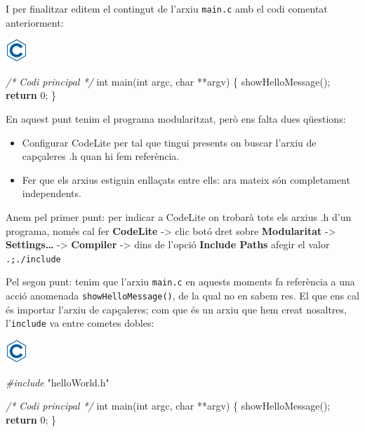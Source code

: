 \documentclass[]{book}
\newenvironment{Shaded}{\begin{snugshade}}{\end{snugshade}}
\newcommand{\DataTypeTok}[1]{\textcolor[rgb]{0.13,0.29,0.53}{#1}}
\newcommand{\DecValTok}[1]{\textcolor[rgb]{0.00,0.00,0.81}{#1}}
\newcommand{\ImportTok}[1]{#1}
\newcommand{\CommentTok}[1]{\textcolor[rgb]{0.56,0.35,0.01}{\textit{#1}}}
\newcommand{\ControlFlowTok}[1]{\textcolor[rgb]{0.13,0.29,0.53}{\textbf{#1}}}
\newcommand{\PreprocessorTok}[1]{\textcolor[rgb]{0.56,0.35,0.01}{\textit{#1}}}
\newcommand{\NormalTok}[1]{#1}
\providecommand{\tightlist}{%
  \setlength{\itemsep}{0pt}\setlength{\parskip}{0pt}}
\begin{document}
I per finalitzar editem el contingut de l'arxiu \texttt{main.c} amb el
codi comentat anteriorment:

\includegraphics{./img/c.png}

\begin{Shaded}
\begin{Highlighting}[]
\CommentTok{/* Codi principal */}
\DataTypeTok{int}\NormalTok{ main(}\DataTypeTok{int}\NormalTok{ argc, }\DataTypeTok{char}\NormalTok{ **argv) \{}
\NormalTok{    showHelloMessage();}
    \ControlFlowTok{return} \DecValTok{0}\NormalTok{;}
\NormalTok{\}}
\end{Highlighting}
\end{Shaded}

En aquest punt tenim el programa modularitzat, però ens falta dues
qüestions:

\begin{itemize}
\tightlist
\item
  Configurar CodeLite per tal que tingui presents on buscar l'arxiu de
  capçaleres .h quan hi fem referència.
\item
  Fer que els arxius estiguin enllaçats entre ells: ara mateix són
  completament independents.
\end{itemize}

Anem pel primer punt: per indicar a CodeLite on trobarà tots els arxius
.h d'un programa, només cal fer \textbf{CodeLite} -\textgreater{} clic
botó dret sobre \textbf{Modularitat} -\textgreater{}
\textbf{Settings\ldots{}} -\textgreater{} \textbf{Compiler}
-\textgreater{} dins de l'opció \textbf{Include Paths} afegir el valor
\texttt{.;./include}

Pel segon punt: tenim que l'arxiu \texttt{main.c} en aquests moments fa
referència a una acció anomenada \texttt{showHelloMessage()}, de la qual
no en sabem res. El que ens cal és importar l'arxiu de capçaleres; com
que és un arxiu que hem creat nosaltres, l'\texttt{include} va entre
cometes dobles:

\includegraphics{./img/c.png}

\begin{Shaded}
\begin{Highlighting}[]
\PreprocessorTok{#include }\ImportTok{"helloWorld.h"}

\CommentTok{/* Codi principal */}
\DataTypeTok{int}\NormalTok{ main(}\DataTypeTok{int}\NormalTok{ argc, }\DataTypeTok{char}\NormalTok{ **argv) \{}
\NormalTok{    showHelloMessage();}
    \ControlFlowTok{return} \DecValTok{0}\NormalTok{;}
\NormalTok{\}}
\end{Highlighting}
\end{Shaded}
\end{document}
